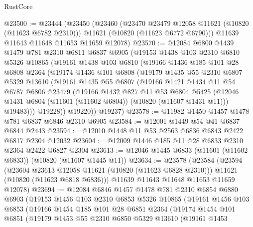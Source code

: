 \begin{lexlean}{RustCore}
\begin{coremodule}
@23500 := @23444
    (@23450
      (@23460
        (@23470 @23479 @12058 @11621 (@10820 (@11623 @6782 @2310)))
        @11621
        (@10820 (@11623 @6772 @6790)))
      @11639
      @11643
      @11648
      @11653
      @11659
      @12078)
@23570 := @12084
    @6800
    @1439
    @1479
    @781
    @2310
    @6811
    @6837
    @6905
    (@19153
      @1438
      @103
      @2310
      @6810
      @5326
      @10865
      (@19161
        @1438
        @103
        @6810
        (@19166
          @1436
          @185
          @101
          @28
          @6808
          @2364
          (@19174
            @1436
            @101
            @6808
            (@19179
              @1435
              @55
              @2310
              @6807
              @5329
              @13610
              (@19161
                @1435
                @55
                @6807
                (@19166
                  @1421
                  @1434
                  @11
                  @54
                  @6787
                  @6806
                  @23479
                  (@19166
                    @1432
                    @827
                    @11
                    @53
                    @6804
                    @5425
                    (@12046 @1431 @6804 (@11601 (@11602 @6804)) (@10820 (@11607 @1431 @11)))
                    @19483)))
              @19228))
          @19220))
      @19237)
@23578 := @11982 @1450 @1457 @1478 @781 @6837 @6846 @2310 @6905
@23584 := @12001 @1449 @54 @41 @6837 @6844 @2443
@23594 := @12010 @1448 @11 @53 @2563 @6836 @6843 @2422 @6817 @2304 @12032
@23604 := @12009 @1446 @185 @11 @28 @6833 @2310 @2364 @2422 @6827 @2304
@23613 := @12046 @1445 @6833 (@11601 (@11602 @6833)) (@10820 (@11607 @1445 @11))
@23634 := @23578
    (@23584
      (@23594
        (@23604 @23613 @12058 @11621 (@10820 (@11623 @6828 @2310)))
        @11621
        (@10820 (@11623 @6818 @6836)))
      @11639
      @11643
      @11648
      @11653
      @11659
      @12078)
@23694 := @12084
    @6846
    @1457
    @1478
    @781
    @2310
    @6854
    @6880
    @6903
    (@19153
      @1456
      @103
      @2310
      @6853
      @5326
      @10865
      (@19161
        @1456
        @103
        @6853
        (@19166
          @1454
          @185
          @101
          @28
          @6851
          @2364
          (@19174
            @1454
            @101
            @6851
            (@19179
              @1453
              @55
              @2310
              @6850
              @5329
              @13610
              (@19161
                @1453

\end{coremodule}
\end{lexlean}
